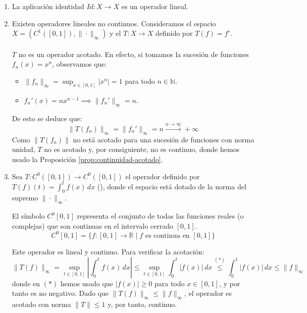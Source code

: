 \begin{ejemplo}
\begin{enumerate}
    \item La aplicación identidad $Id: X \longrightarrow X$ es un operador lineal.
    \item Existen operadores lineales no continuos. Consideramos el espacio $X = (C^1([0,1]), \|\cdot\|_\infty)$ y el  $T: X \longrightarrow X$ definido por $T(f) = f'$. \\ \\
    \noindent
    $T$ no es un operador acotado. En efecto, si tomamos la sucesión de funciones $f_n(x) = x^n$, observamos que:
    \begin{itemize}
        \item $\|f_n\|_\infty = \sup_{x \in [0,1]} |x^n| = 1$ para todo $n \in \mathbb{N}$.
        \item $f_n'(x) = nx^{n-1} \implies \|f_n'\|_\infty = n$.
    \end{itemize}
    De esto se deduce que:
    \begin{equation*}
        \|T(f_n)\|_\infty = \|f_n'\|_\infty = n \xrightarrow{n \to \infty} +\infty
    \end{equation*}
    Como $\|T(f_n)\|$ no está acotado para una sucesión de funciones con norma unidad, $T$ no es acotado y, por consiguiente, no es continuo, donde hemos usado la Proposición \ref{prop:continuidad-acotado}.

    \item Sea $T: C^0([0,1]) \longrightarrow C^0([0,1])$ el operador definido por $T(f)(t) = \int_{0}^{t} f(x) \, dx$ (), donde el espacio está dotado de la norma del supremo $\|\cdot\|_\infty$.
    \begin{observacion}
        El símbolo $C^0[0,1]$ representa el conjunto de todas las funciones reales (o complejas) que son continuas en el intervalo cerrado $[0, 1]$.
        $$C^0[0,1] = \{ f: [0,1] \to \mathbb{R} \mid f \text{ es continua en } [0,1] \}$$
    \end{observacion}
    
    Este operador es lineal y continuo. Para verificar la acotación:
    \begin{equation*}
        \|T(f)\|_\infty = \sup_{t \in [0,1]} \left| \int_{0}^{t} f(x) \, dx \right| \leq \sup_{t \in [0,1]} \int_{0}^{t} |f(x)| \, dx \overset{(*)}{\leq} \int_{0}^{1} |f(x)| \, dx \leq \|f\|_\infty
    \end{equation*}
    donde en $(*)$ hemos usado que $|f(x)|\geq 0$ para todo $x \in [0,1]$, y por tanto es no negativo. Dado que $\|T(f)\|_\infty \leq \|f\|_\infty$, el operador es acotado con norma $\|T\| \leq 1$ y, por tanto, continuo. \\


\end{enumerate}
\end{ejemplo}
